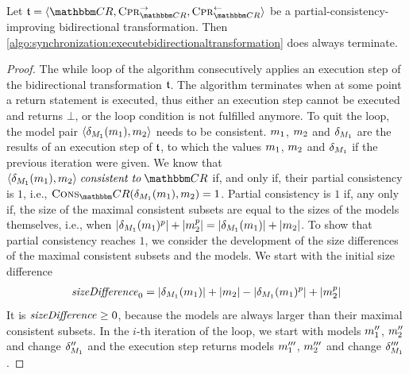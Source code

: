 \begin{lemma}
    \label{lemma:bidirectionaltransformationtermination}
    Let $\transformation{t} = \tupled{\consistencyrelationset{CR}, \consistencypreservationrule{\consistencyrelationset{CR}}^{\rightarrow}, \consistencypreservationrule{\consistencyrelationset{CR}}^{\leftarrow}}$ be a partial-consistency-improving bidirectional transformation.
    Then \autoref{algo:synchronization:executebidirectionaltransformation} does always terminate.
\end{lemma}
\begin{proof}
    The while loop of the algorithm consecutively applies an execution step of the bidirectional transformation $\mathfrak{t}$.
    The algorithm terminates when at some point a return statement is executed, thus either an execution step cannot be executed and returns $\bot$, or the loop condition is not fulfilled anymore.
    To quit the loop, the model pair $\langle \delta_{M_{1}}(m_{1}), m_{2} \rangle$ needs to be consistent.
    $m_{1}$, $m_{2}$ and $\delta_{M_{1}}$ are the results of an execution step of $\mathfrak{t}$, to which the values $m_{1}$, $m_{2}$ and $\delta_{M_{1}}$ if the previous iteration were given.
    We know that $\tupled{\change{\metamodel{M}{1}}(\model{m}{1}), \model{m}{2}} \consistenttomath \consistencyrelationset{CR}$ if, and only if, their partial consistency is $1$, i.e., $\function{Cons}_\consistencyrelationset{CR}(\change{\metamodel{M}{1}}(\model{m}{1}), \model{m}{2}) = 1$.
    Partial consistency is $1$ if, any only if, the size of the maximal consistent subsets are equal to the sizes of the models themselves, i.e., when $\lvert\delta_{M_{1}}(m_{1})^p\rvert + \lvert m_{2}^p\rvert = \lvert\delta_{M_{1}}(m_{1})\rvert + \lvert m_{2}\rvert$.
    To show that partial consistency reaches $1$, we consider the development of the size differences of the maximal consistent subsets and the models.
    We start with the initial size difference
    \begin{align*}
        \mathit{sizeDifference}_0 = \lvert\delta_{M_{1}}(m_{1})\rvert + \lvert m_{2}\rvert - \lvert\delta_{M_{1}}(m_{1})^p\rvert + \lvert m_{2}^p\rvert
    \end{align*}
    It is $\mathit{sizeDifference} \geq 0$, because the models are always larger than their maximal consistent subsets.
    In the $i$-th iteration of the loop, we start with models $m_{1}''$, $m_{2}''$ and change $\delta_{M_{1}}''$ and the execution step returns models $m_{1}'''$, $m_{2}'''$ and change $\delta_{M_{1}}'''$.

\end{proof}
